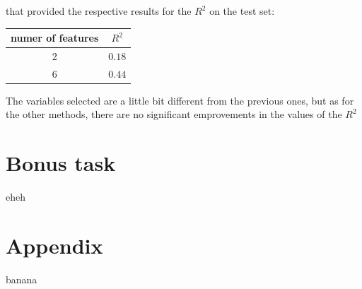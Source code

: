 \documentclass[a4paper,oneside,12pt]{article}
\begin{document}
that provided the respective results for the $R^2$ on the test set:
\begin{table}[H]
\centering
\begin{tabular}{|c|c|}
\hline
numer of features & $R^2$ \\
\hline
2  & $0.18$ \\
\hline
6  & $0.44$ \\
\hline

\end{tabular}
\end{table}

The variables selected are a little bit different from the previous ones, but as for the other methods, there are no significant emprovements in the values of the $R^2$

\newpage
\section{Bonus task}

eheh

\newpage
\appendix

\section{Appendix}
banana
\end{document}
